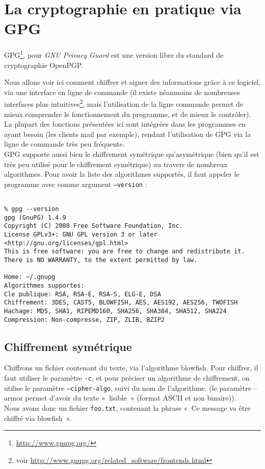\chapter{La cryptographie en pratique via GPG}
\thispagestyle{empty}

GPG\footnote{\url{http://www.gnupg.org/}}, pour 
\emph{GNU Privacy Guard} est une version libre du
standard de cryptographie OpenPGP.

Nous allons voir ici comment chiffrer et signer des informations 
grâce à ce
logiciel, via une interface en ligne de commande (il existe
néanmoins de nombreuses interfaces plus intuitives\footnote{voir
\url{http://www.gnupg.org/related_software/frontends.html}}, mais
l'utilisation de la ligne commande permet de mieux comprendre le
fonctionnement du programme, et de mieux le contrôler).
La plupart des fonctions présentées ici sont intégrées dans les
programmes en ayant besoin (les clients mail par exemple), rendant
l'utilisation de GPG via la ligne de commande très peu fréquente.
\\

GPG supporte aussi bien le chiffrement symétrique qu'asymétrique
(bien qu'il est très peu utilisé pour le chiffrement symétrique)
au travers de nombreux algorithmes. Pour avoir la liste des
algorithmes supportés, il faut appeler le programme avec comme
argument \texttt{--version} : 

\lstset{language=bash}
\begin{lstlisting}

% gpg --version 
gpg (GnuPG) 1.4.9
Copyright (C) 2008 Free Software Foundation, Inc.
License GPLv3+: GNU GPL version 3 or later
<http://gnu.org/licenses/gpl.html>
This is free software: you are free to change and redistribute it.
There is NO WARRANTY, to the extent permitted by law.

Home: ~/.gnupg
Algorithmes supportes:
Cle publique: RSA, RSA-E, RSA-S, ELG-E, DSA
Chiffrement: 3DES, CAST5, BLOWFISH, AES, AES192, AES256, TWOFISH
Hachage: MD5, SHA1, RIPEMD160, SHA256, SHA384, SHA512, SHA224
Compression: Non-compresse, ZIP, ZLIB, BZIP2
\end{lstlisting}

\section{Chiffrement symétrique}
Chiffrons un fichier contenant du texte, via l'algorithme
blowfish. Pour chiffrer, il faut utiliser le paramètre
\texttt{-c}, et pour préciser un algorithme de chiffrement, on
utilise le paramètre \texttt{--cipher-algo}, suivi du nom de
l'algorithme. (le paramètre
--armor permet d'avoir du texte «~lisible~» (format ASCII et non
binaire)).
\\
Nous avons donc un fichier \texttt{foo.txt}, contenant la phrase
«~Ce message va être chiffré via blowfish~».

